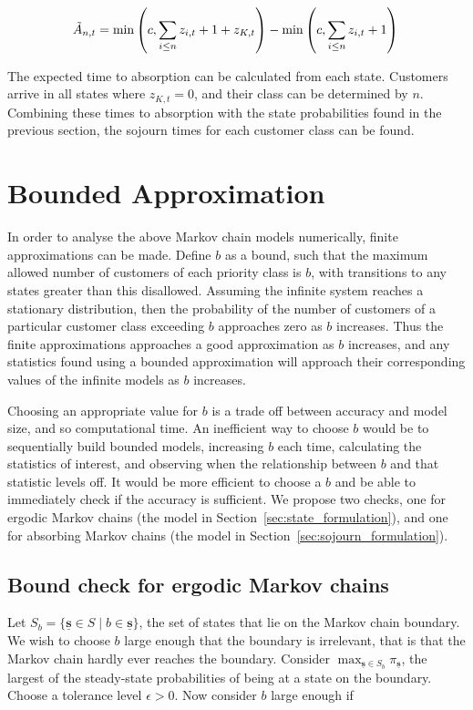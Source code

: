 \documentclass{article}
\begin{document}
\begin{equation}\label{eqn:inservice_adapt_tilde}
\tilde{A}_{n,t} =
\min\left(c, \sum_{i \leq n} z_{i,t} + 1 + z_{K,t}\right) - \min\left(c, \sum_{i \leq n} z_{i,t} + 1\right) \\
\end{equation}


The expected time to absorption can be calculated from each state.
Customers arrive in all states where $z_{K,t} = 0$, and their class can be
determined by $n$. Combining these times to absorption with the state
probabilities found in the previous section, the sojourn times for each customer
class can be found.




\section{Bounded Approximation}\label{sec:bound}
In order to analyse the above Markov chain models numerically, finite
approximations can be made. Define $b$ as a bound, such that the maximum allowed
number of customers of each priority class is $b$, with transitions to any
states greater than this disallowed.
Assuming the infinite system reaches a stationary distribution, then the
probability of the number of customers of a particular customer class exceeding
$b$ approaches zero as $b$ increases. Thus the finite approximations approaches
a good approximation as $b$ increases, and any statistics found using a bounded
approximation will approach their corresponding values of the infinite models as
$b$ increases.


Choosing an appropriate value for $b$ is a trade off between accuracy and model
size, and so computational time. An inefficient way to choose $b$ would be to
sequentially build bounded models, increasing $b$ each time, calculating the
statistics of interest, and observing when the relationship between $b$ and that
statistic levels off.
It would be more efficient to choose a $b$ and be able to immediately check if
the accuracy is sufficient. We propose two checks, one for ergodic Markov
chains (the model in Section~\ref{sec:state_formulation}), and one for absorbing
Markov chains (the model in Section~\ref{sec:sojourn_formulation}).




\subsection{Bound check for ergodic Markov chains}\label{sec:ergodic_check}
Let $S_b = \{\underline{\mathbf{s}} \in S \;|\; b \in \underline{\mathbf{s}}\}$, the
set of states that lie on the Markov chain boundary. We wish to choose $b$ large
enough that the boundary is irrelevant, that is that the Markov chain hardly
ever reaches the boundary. Consider
$\max_{\underline{\mathbf{s}} \in S_b} \pi_{\underline{\mathbf{s}}}$, the
largest of the steady-state probabilities of being at a state on the boundary.
Choose a tolerance level $\epsilon > 0$. Now consider $b$ large enough if
\end{document}
